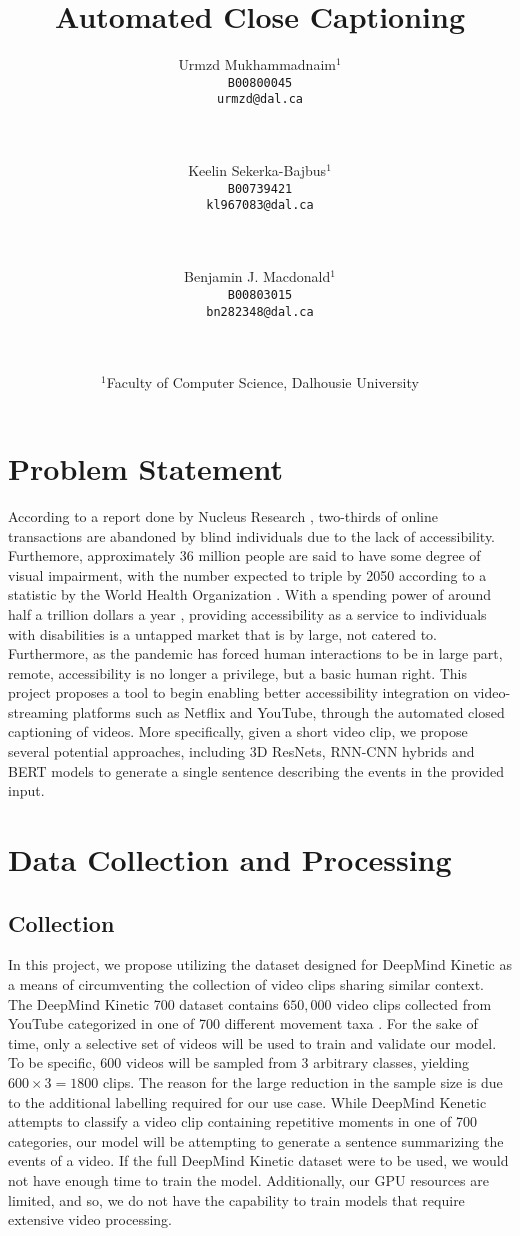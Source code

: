\documentclass[10pt]{article}
\title{Automated Close Captioning}
\author{
Urmzd Mukhammadnaim$^1$\\
\texttt{B00800045} \\
\texttt{urmzd@dal.ca} \\
\\
\\
\and
Keelin Sekerka-Bajbus$^1$\\
\texttt{B00739421}\\
\texttt{kl967083@dal.ca}\\
\\
\\
\and
Benjamin J. Macdonald$^1$\\
\texttt{B00803015}\\
\texttt{bn282348@dal.ca}\\
\\
\\
}
\date{$^1$Faculty of Computer Science, Dalhousie University}
\begin{document}
\maketitle

\section{Problem Statement}
According to a report done by Nucleus Research \cite{nucleus_research_2019}, two-thirds
of online transactions are abandoned by blind individuals due to the lack of accessibility.
Furthemore, approximately 36 million people are said to have some degree of visual impairment, with the number
expected to triple by 2050 according to a statistic by the World Health Organization \cite{world_health_organization_2021}.
With a spending power of around half a trillion dollars a year \cite{yin_smith_overton_shaewitz_2018}, providing accessibility
as a service to individuals with disabilities is a untapped market that is by large, not catered to.
Furthermore, as the pandemic has forced human interactions to be in large part, remote, accessibility is no longer
a privilege, but a basic human right. This project proposes a tool to begin enabling better accessibility
integration on video-streaming platforms such as Netflix and YouTube, through the automated
closed captioning of videos. More specifically, given a short video clip, we propose several potential approaches,
including 3D ResNets, RNN-CNN hybrids and BERT models to generate a single sentence describing the events in the provided input.

\section{Data Collection and Processing}

\subsection{Collection}
In this project, we propose utilizing the dataset designed for DeepMind Kinetic as a means of
circumventing the collection of video clips sharing similar context. 
The DeepMind Kinetic 700 dataset contains $650,000$ video clips collected from YouTube
categorized in one of 700 different movement taxa \cite{DBLP:journals/corr/abs-2010-10864}. 
For the sake of time, only a selective set of videos will be used to train and validate
our model. To be specific, $600$ videos will be sampled from $3$ arbitrary classes, yielding 
$600 \times 3 = 1800$ clips. The reason for the large reduction in the sample size is due to the additional labelling
required for our use case. While DeepMind Kenetic attempts to classify a video clip containing repetitive moments
in one of 700 categories, our model will be attempting to generate a sentence summarizing the events of a video.
If the full DeepMind Kinetic dataset were to be used, we would not have enough time to train the model.
Additionally, our GPU resources are limited, and so, we do not have the capability to train models
that require extensive video processing.
\end{document}
